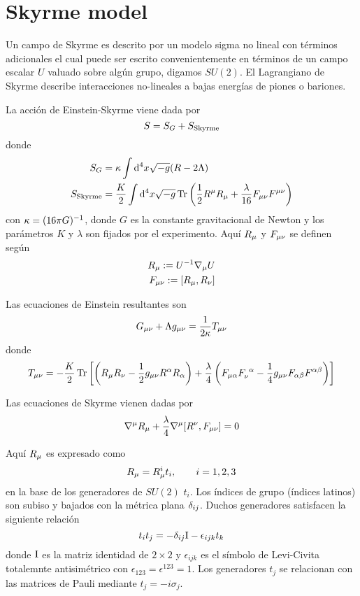 \section{Skyrme model}
Un campo de Skyrme es descrito por un modelo sigma no lineal con términos adicionales el cual puede ser escrito convenientemente en términos de un campo escalar $U$ valuado sobre algún grupo, digamos $SU(2)$. El Lagrangiano de Skyrme describe interacciones no-lineales a bajas energías de piones o bariones.

La acción de Einstein-Skyrme viene dada por
\begin{equation}
  S=S_G+S_{\rm Skyrme}
\end{equation}
donde 
\begin{align}
  S_G&=\kappa\int\dd^4x\sqrt{-g}(R-2\Lambda)\\
  S_{\rm Skyrme}&=\frac{K}{2}\int\dd^4x\sqrt{-g}\Tr\left(\frac{1}{2}R^\mu R_\mu +\frac{\lambda}{16}F_{\mu\nu }F^{\mu\nu }\right)
\end{align}
con $\kappa=(16\pi G)^{-1}$, donde $G$ es la constante gravitacional de Newton y los parámetros $K$ y $\lambda$ son fijados por el experimento. Aquí $R_\mu $ y $F_{\mu\nu }$ se definen según
\begin{align}
  R_\mu :=U^{-1}\nabla_\mu U\label{R}\\
  F_{\mu\nu}:=[R_\mu, R_\nu ]\label{F}
\end{align}

Las ecuaciones de Einstein resultantes son
\begin{equation}
  G_{\mu\nu }+\Lambda g_{\mu\nu }=\frac{1}{2\kappa }T_{\mu\nu }
\end{equation}
donde
\begin{equation}
  T_{\mu\nu }=-\frac{K}{2}\Tr\left[\left(R_\mu R_\nu -\frac{1}{2}g_{\mu\nu }R^\alpha R_\alpha \right)+\frac{\lambda}{4}\left(F_{\mu\alpha }F_\nu ^{~\alpha }-\frac{1}{4}g_{\mu\nu }F_{\alpha\beta }F^{\alpha\beta}\right)\right]
\end{equation}

Las ecuaciones de Skyrme vienen dadas por
\begin{equation}
  \nabla^\mu R_\mu +\frac{\lambda}{4}\nabla^\mu [R^\nu ,F_{\mu\nu }]=0
\end{equation}

Aquí $R_\mu $ es expresado como
\begin{equation}
  R_\mu =R_\mu ^{i}t_i,\qquad i=1,2,3
\end{equation}
en la base de los generadores de $SU(2)$ $t_i$. Los índices de grupo (índices latinos) son subiso y bajados con la métrica plana $\delta_{ij}$. Duchos generadores satisfacen la siguiente relación
\begin{equation}\label{titj}
  t_it_j=-\delta_{ij}\mathrm{I}-\epsilon_{ijk}t_k
\end{equation}
donde $\mathrm{I} $ es la matriz identidad de $2\times 2$ y $\epsilon_{ijk}$ es el símbolo de Levi-Civita totalemnte antisimétrico con $\epsilon_{123}=\epsilon^{123}=1$. Los generadores $t_j$ se relacionan con las matrices de Pauli mediante $t_j=-i\sigma_j$.

